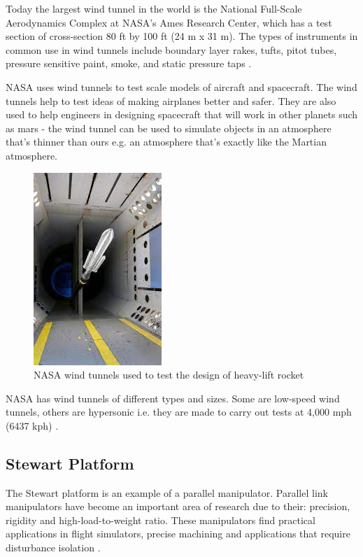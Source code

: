 Today the largest wind tunnel in the world is the National Full-Scale Aerodynamics Complex at NASA's Ames Research Center, which has a test section of cross-section 80 ft by 100 ft (24 m x 31 m). The types of instruments in common use in wind tunnels include boundary layer rakes, tufts, pitot tubes, pressure sensitive paint, smoke, and static pressure taps \cite{morris_force_2010}.

NASA uses wind tunnels to test scale models of aircraft and spacecraft. The wind tunnels help to test ideas of making airplanes better and safer. They are also used to help engineers in designing spacecraft that will work in other planets such as mars - the wind tunnel can be used to simulate objects in an atmosphere that's thinner than ours e.g. an atmosphere that's exactly like the Martian atmosphere. 
\begin{center}
    \begin{figure}[H]
\centering
\includegraphics{Figures/Fig4}
\caption[NASA Wind tunnel - space application]{NASA wind tunnels used to test the design of heavy-lift rocket \cite{NASA}}
\end{figure}
\end{center}
NASA has wind tunnels of different types and sizes. Some are low-speed wind tunnels, others are hypersonic i.e. they are made to carry out tests at 4,000 mph (6437 kph) \cite{NASA}.
\subsection{Stewart Platform}
The Stewart platform is an example of a parallel manipulator.
Parallel link manipulators have become an important area of research due to their: precision, rigidity and high-load-to-weight ratio. 
These manipulators find practical applications in flight simulators, precise machining and applications that require disturbance isolation \cite{iqbal_dynamic_2008}. 

